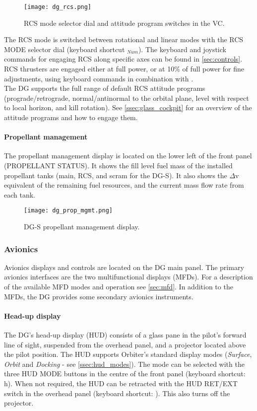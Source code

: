 \documentclass[Orbiter User Manual.tex]{subfiles}
\begin{document}
\begin{figure}[H]
  \centering
  \texttt{[image: dg\_rcs.png]}
  \caption{RCS mode selector dial and attitude program switches in the VC.}
\end{figure}

\noindent
The RCS mode is switched between rotational and linear modes with the RCS MODE selector dial (keyboard shortcut \keystroke{/}$_{Num}$). The keyboard and joystick commands for engaging RCS along specific axes can be found in \ref{sec:controls}. RCS thrusters are engaged either at full power, or at 10\% of full power for fine adjustments, using keyboard commands in combination with \Ctrl.\\
The DG supports the full range of default RCS attitude programs (prograde/retrograde, normal/antinormal to the orbital plane, level with respect to local horizon, and kill rotation). See \ref{ssec:glass_cockpit} for an overview of the attitude programs and how to engage them.

\paragraph{Propellant management}
The propellant management display is located on the lower left of the front panel (PROPELLANT STATUS). It shows the fill level fuel mass of the installed propellant tanks (main, RCS, and scram for the DG-S). It also shows the $\Delta$v equivalent of the remaining fuel resources, and the current mass flow rate from each tank.

\begin{figure}[H]
  \centering
  \texttt{[image: dg\_prop\_mgmt.png]}
  \caption{DG-S propellant management display.}
\end{figure}

\subsubsection{Avionics}
Avionics displays and controls are located on the DG main panel. The primary avionics interfaces are the two multifunctional displays (MFDs). For a description of the available MFD modes and operation see \ref{sec:mfd}. In addition to the MFDs, the DG provides some secondary avionics instruments.

\paragraph{Head-up display}
The DG's head-up display (HUD) consists of a glass pane in the pilot's forward line of sight, suspended from the overhead panel, and a projector located above the pilot position. The HUD supports Orbiter's standard display modes (\textit{Surface}, \textit{Orbit} and \textit{Docking} - see \ref{ssec:hud_modes}). The mode can be selected with the three HUD MODE buttons in the centre of the front panel (keyboard shortcut: h). When not required, the HUD can be retracted with the HUD RET/EXT switch in the overhead panel (keyboard shortcut: \Ctrl{}). This also turns off the projector.
\end{document}
